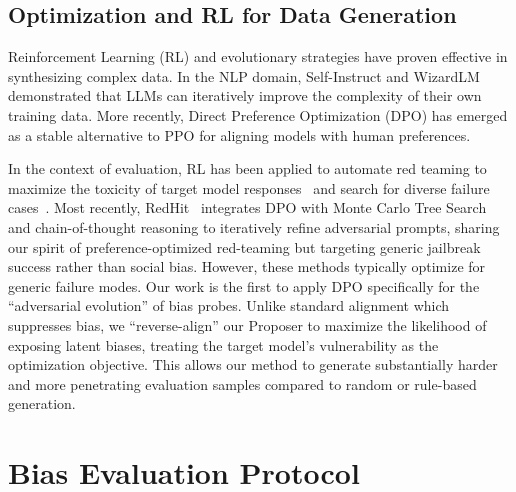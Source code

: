 \documentclass[lettersize,journal]{IEEEtran}
\begin{document}
\subsection{Optimization and RL for Data Generation}
Reinforcement Learning (RL) and evolutionary strategies have proven effective in synthesizing complex data. In the NLP domain, Self-Instruct\cite{wang2023self} and WizardLM\cite{xu2023wizardlm} demonstrated that LLMs can iteratively improve the complexity of their own training data. More recently, Direct Preference Optimization (DPO)\cite{rafailov2023direct} has emerged as a stable alternative to PPO\cite{schulman2017proximal} for aligning models with human preferences.

In the context of evaluation, RL has been applied to automate red teaming to maximize the toxicity of target model responses~\cite{perez2022red} and search for diverse failure cases~\cite{casper2023explore}. Most recently, RedHit~\cite{sorkhpour2025redhit} integrates DPO with Monte Carlo Tree Search and chain-of-thought reasoning to iteratively refine adversarial prompts, sharing our spirit of preference-optimized red-teaming but targeting generic jailbreak success rather than social bias. However, these methods typically optimize for generic failure modes. Our work is the first to apply DPO specifically for the ``adversarial evolution'' of bias probes. Unlike standard alignment which suppresses bias, we ``reverse-align'' our Proposer to maximize the likelihood of exposing latent biases, treating the target model's vulnerability as the optimization objective. This allows our method to generate substantially harder and more penetrating evaluation samples compared to random or rule-based generation\cite{ribeiro2020beyond,kiela2021dynabench,li2025reversegen}.





\section{Bias Evaluation Protocol}
\label{sec:protocol}
\end{document}
